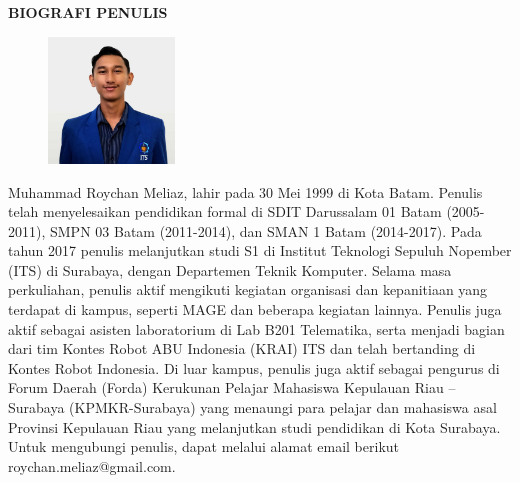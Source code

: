 \begin{center}
  \Large
  \textbf{BIOGRAFI PENULIS}
\end{center}


\vspace{2ex}

\begin{figure}
  \centering
  \vspace{-3ex}
  \includegraphics[width=0.3\textwidth]{images/roy.jpg}
  \vspace{-4ex}
\end{figure}

Muhammad Roychan Meliaz, lahir pada 30 Mei 1999 di Kota Batam. Penulis telah menyelesaikan pendidikan formal di SDIT Darussalam 01 Batam (2005-2011), SMPN 03 Batam (2011-2014), dan SMAN 1 Batam (2014-2017). Pada tahun 2017 penulis melanjutkan studi S1 di Institut Teknologi Sepuluh Nopember (ITS) di Surabaya, dengan Departemen Teknik Komputer. Selama masa perkuliahan, penulis aktif mengikuti kegiatan organisasi dan kepanitiaan yang terdapat di kampus, seperti MAGE dan beberapa kegiatan lainnya. Penulis juga aktif sebagai asisten laboratorium di Lab B201 Telematika, serta menjadi bagian dari tim Kontes Robot ABU Indonesia (KRAI) ITS dan telah bertanding di Kontes Robot Indonesia. Di luar kampus, penulis juga aktif sebagai pengurus di Forum Daerah (Forda) Kerukunan Pelajar Mahasiswa Kepulauan Riau – Surabaya (KPMKR-Surabaya) yang menaungi para pelajar dan mahasiswa asal Provinsi Kepulauan Riau yang melanjutkan studi pendidikan di Kota Surabaya. Untuk mengubungi penulis, dapat melalui alamat email berikut roychan.meliaz@gmail.com. 


